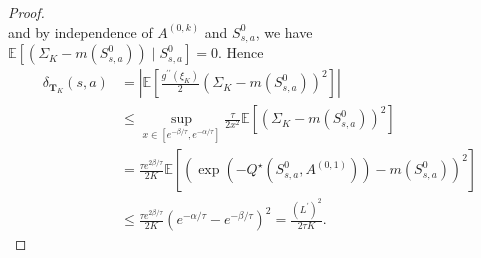 \documentclass[10pt,a4paper]{amsart}
\begin{document}
\begin{proof}
\[    \]
    and by independence of $A^{(0,k)}$ and $S^0_{s,a}$, we have $\mathbb E \left[ (\Sigma_K - m(S^0_{s,a})) \mid S_{s,a}^0\right] = 0$.
    Hence
    \[
    \begin{aligned}
        \delta_{\mathbf T_K} (s,a) &= \left| \mathbb E \left[ \frac{g^{\prime \prime}(\xi_K)}{2} (\Sigma_K - m(S^0_{s,a}))^2 \right] \right| \\ 
        &\leq \sup_{x \in [e^{-\beta / \tau}, e^{-\alpha / \tau}]} \frac{\tau}{2 x^2} \mathbb E\left[ \left( \Sigma_K - m(S^0_{s,a}) \right)^2 \right]  \\
        &= \frac{\tau e^{2\beta / \tau}}{2K} \mathbb E \left[ \left(\exp( - Q^\star (S^0_{s,a}, A^{(0,1)})) - m(S_{s,a}^0)\right)^2 \right] \\
        & \leq \frac{\tau e^{2 \beta / \tau}}{2K} \left(e^{-\alpha / \tau} - e^{-\beta / \tau}\right)^2 = \frac{(L^\prime)^2}{2\tau K}.
    \end{aligned}
    \]
\end{proof}
\end{document}
